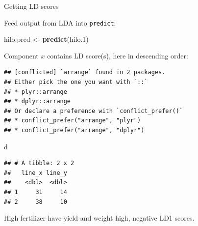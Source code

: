 \documentclass[ignorenonframetext,]{beamer}
\newenvironment{Shaded}{\begin{snugshade}}{\end{snugshade}}
\newcommand{\FloatTok}[1]{\textcolor[rgb]{0.00,0.00,0.81}{#1}}
\newcommand{\KeywordTok}[1]{\textcolor[rgb]{0.13,0.29,0.53}{\textbf{#1}}}
\newcommand{\NormalTok}[1]{#1}
\newcommand{\OperatorTok}[1]{\textcolor[rgb]{0.81,0.36,0.00}{\textbf{#1}}}
\newcommand{\StringTok}[1]{\textcolor[rgb]{0.31,0.60,0.02}{#1}}
\begin{document}
\begin{frame}[fragile]{Getting LD scores}
\protect\hypertarget{getting-ld-scores}{}

Feed output from LDA into \texttt{predict}:

\begin{Shaded}
\begin{Highlighting}[]
\NormalTok{hilo.pred <-}\StringTok{ }\KeywordTok{predict}\NormalTok{(hilo}\FloatTok{.1}\NormalTok{)}
\end{Highlighting}
\end{Shaded}

Component \(x\) contains LD score(s), here in descending order:

\begin{Shaded}
\end{Shaded}

\begin{verbatim}
## [conflicted] `arrange` found in 2 packages.
## Either pick the one you want with `::` 
## * plyr::arrange
## * dplyr::arrange
## Or declare a preference with `conflict_prefer()`
## * conflict_prefer("arrange", "plyr")
## * conflict_prefer("arrange", "dplyr")
\end{verbatim}

\begin{Shaded}
\begin{Highlighting}[]
\NormalTok{d}
\end{Highlighting}
\end{Shaded}

\begin{verbatim}
## # A tibble: 2 x 2
##   line_x line_y
##    <dbl>  <dbl>
## 1     31     14
## 2     38     10
\end{verbatim}

High fertilizer have yield and weight high, negative LD1 scores.

\end{frame}
\end{document}
